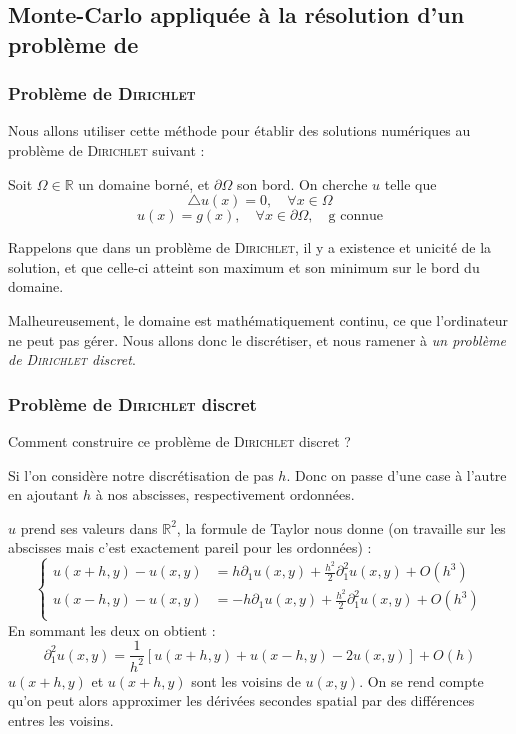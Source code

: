 \documentclass[12pt, a4paper]{article}
\begin{document}
\subsection{Monte-Carlo appliquée à la résolution d'un problème de }

\subsubsection{Problème de \textsc{Dirichlet}}

Nous allons utiliser cette méthode pour établir des solutions numériques au problème de \textsc{Dirichlet}
suivant : \medbreak

Soit $\Omega \in \mathbb{R}$ un domaine borné, et $\partial\Omega$ son bord. On cherche $u$ telle
que \[\bigtriangleup u(x) = 0, \quad \forall x \in \Omega\] \[u(x) = g(x), \quad \forall x \in
\partial \Omega, \quad \text{g connue}\]

Rappelons que dans un problème de \textsc{Dirichlet}, il y a existence et unicité de la solution, et que
celle-ci atteint son maximum et son minimum sur le bord du domaine.  \medbreak


Malheureusement, le domaine est mathématiquement continu, ce que l'ordinateur ne peut pas gérer.
Nous allons donc le discrétiser, et nous ramener à \emph{un problème de \textsc{Dirichlet} discret}.
\medbreak

\subsubsection{Problème de \textsc{Dirichlet} discret }

Comment construire ce problème de \textsc{Dirichlet} discret ?

Si l'on considère notre discrétisation de pas $h$. Donc on passe d'une case à l'autre en ajoutant
$h$ à nos abscisses, respectivement ordonnées.

$u$ prend ses valeurs dans $\mathbb{R}^2$, la formule de Taylor nous donne (on travaille sur les
abscisses mais c'est exactement pareil pour les ordonnées) : \[ \begin{cases} u(x+h,y) - u(x,y) &=
        h\partial_1 u(x,y) + \frac{h^2}{2}\partial_1^2 u(x,y)+ O(h^3)\\ u(x-h,y) - u(x,y) &=
        -h\partial_1 u(x,y) + \frac{h^2}{2}\partial_1^2 u(x,y)+ O(h^3)\\ \end{cases} \] En sommant
    les deux on obtient : \[ \partial_1^2 u(x,y)= \frac{1}{h^2}\left[u(x+h,y) + u(x-h,y) - 2u(x,y)
    \right] + O(h) \] $u(x+h, y) $ et $u(x+h, y) $ sont les voisins de $u(x,y)$.  On se rend compte
    qu'on peut alors approximer les dérivées secondes spatial par des différences entres les
    voisins.  \smallbreak
\end{document}
